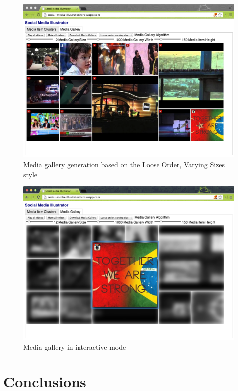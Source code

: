 \begin{figure}[!ht]
  \centering
  \includegraphics[width=1\columnwidth]{app4.png}
  \caption[Media gallery generation based on the Loose Order, Varying Sizes style]{Media gallery generation based on the Loose Order, Varying Sizes style}
  \label{fig:mediagallerycompilation1}
\end{figure}

\begin{figure}[!ht]
  \centering
  \includegraphics[width=1\columnwidth]{app5.png}
  \caption{Media gallery in interactive mode}
  \label{fig:mediagallerycompilation2}
\end{figure}

\section{Conclusions}

